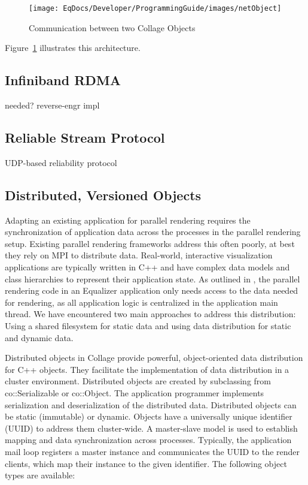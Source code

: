 \documentclass[10pt,journal,compsoc]{IEEEtran}
\newcommand{\fig}[1]{Figure~\ref{#1}}
\begin{document}
\begin{figure}[ht]\center
  \texttt{[image: EqDocs/Developer/ProgrammingGuide/images/netObject]}
  \caption{\label{fNetObject}Communication between two Collage Objects}
\end{figure}
\fig{fNetObject} illustrates this architecture.

\subsection{Infiniband RDMA}

needed? reverse-engr impl

\subsection{Reliable Stream Protocol}\label{SEC_RSP}

UDP-based reliability protocol

\subsection{Distributed, Versioned Objects}

Adapting an existing application for parallel rendering requires the
synchronization of application data across the processes in the parallel
rendering setup. Existing parallel rendering frameworks address this often
poorly, at best they rely on MPI to distribute data. Real-world, interactive
visualization applications are typically written in C++ and have complex data
models and class hierarchies to represent their application state. As outlined
in \cite{EMP:09}, the parallel rendering code in an Equalizer application only
needs access to the data needed for rendering, as all application logic is
centralized in the application main thread. We have encountered two main
approaches to address this distribution: Using a shared filesystem for static
data and using data distribution for static and dynamic data.

Distributed objects in Collage provide powerful, object-oriented data
distribution for C++ objects. They facilitate the implementation of data
distribution in a cluster environment. Distributed objects are created by
subclassing from \textsf{co::Serializable} or \textsf{co::Object}. The
application programmer implements serialization and deserialization of the
distributed data. Distributed objects can be static (immutable) or
dynamic. Objects have a universally unique identifier (UUID) to address them
cluster-wide. A master-slave model is used to establish mapping and data
synchronization across processes. Typically, the application mail loop registers
a master instance and communicates the UUID to the render clients, which map
their instance to the given identifier. The following object types are
available:
\end{document}

